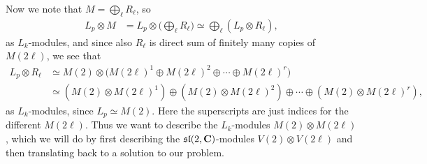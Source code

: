 Now we note that $M=\bigoplus_{\ell} R_\ell$, so 
\begin{align*}
  L_p\otimes M &= L_p\otimes \bigl( \bigoplus_{\ell} R_\ell \bigr) \simeq \bigoplus_{\ell} (L_p\otimes R_\ell),
\end{align*}
as $L_k$-modules, and since also $R_\ell$ is direct sum of finitely many copies of $M(2\ell)$, we see that
\begin{align*}
  L_p\otimes R_\ell &\simeq M(2)\otimes \bigl( M(2\ell)^1 \oplus M(2\ell)^2 \oplus \dotsb \oplus M(2\ell)^r \bigr) \\
  &\simeq (M(2)\otimes M(2\ell)^1) \oplus (M(2)\otimes M(2\ell)^2) \oplus \dotsb \oplus (M(2)\otimes M(2\ell)^r),
\end{align*}
as $L_k$-modules, since $L_p\simeq M(2)$. Here the superscripts are just indices for the different $M(2\ell)$. Thus we want to describe the $L_k$-modules $M(2)\otimes M(2\ell)$, which we will do by first describing the $\mathfrak{sl}(2,\mathbf{C})$-modules $V(2)\otimes V(2\ell)$ and then translating back to a solution to our problem.

